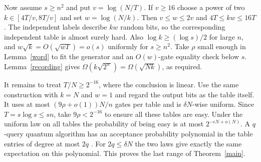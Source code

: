 \documentclass[11pt]{article}
\begin{document}
Now assume $s\ge n^2$ and put $v=\log(N/T)$. If $v\ge16$ choose a power of two $k\in[4T/v,8T/v]$ and set $w=\log(N/k)$. Then $v\le w\le2v$ and $4T\le kw\le16T$. The independent labels describe $kw$ random bits, so the corresponding independent table is almost surely hard. Also $\log k\ge(\log s)/2$ for large $n$, and $w\sqrt{k}=O(\sqrt{wT})=o(s)$ uniformly for $s\ge n^2$. Take $\rho$ small enough in Lemma~\ref{word} to fit the generator and an $O(w)$-gate equality check below $s$. Lemma~\ref{recording} gives $\Omega(k\sqrt{2^w})=\Omega(\sqrt{Nk})$, as required.

It remains to treat $T/N\ge2^{-16}$, where the conclusion is linear. Use the same construction with $k=N$ and $w=1$ and regard the output bits as the table itself. It uses at most $(9\rho+o(1))N/n$ gates per table and is $\delta N$-wise uniform. Since $T=s\log s\le sn$, take $9\rho<2^{-16}$ to ensure all these tables are easy. Under the uniform law on all tables the probability of being easy is at most $2^{-\epsilon N+o(N)}$. A $q$-query quantum algorithm has an acceptance probability polynomial in the table entries of degree at most $2q$ \cite{bbcmw}. For $2q\le\delta N$ the two laws give exactly the same expectation on this polynomial. This proves the last range of Theorem~\ref{main}.
\end{document}

